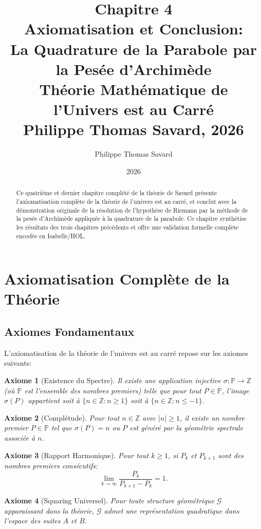 \documentclass[12pt,a4paper]{article}
\title{%
  \textbf{Chapitre 4}\\[0.5em]
  \Large Axiomatisation et Conclusion:\\
  La Quadrature de la Parabole par la Pesée d'Archimède\\[0.5em]
  \large Théorie Mathématique de l'Univers est au Carré\\[0.5em]
  \normalsize Philippe Thomas Savard, 2026
}
\author{Philippe Thomas Savard}
\date{2026}
\newtheorem{axiome}{Axiome}
\begin{document}
\maketitle
\tableofcontents
\newpage

\begin{abstract}
Ce quatrième et dernier chapitre complété de la théorie de Savard présente l'axiomatisation
complète de la théorie de l'univers est au carré, et conclut avec la démonstration
originale de la résolution de l'hypothèse de Riemann par la méthode de la pesée
d'Archimède appliquée à la quadrature de la parabole. Ce chapitre synthétise les
résultats des trois chapitres précédents et offre une validation formelle complète
encodée en Isabelle/HOL.
\end{abstract}

\section{Axiomatisation Complète de la Théorie}

\subsection{Axiomes Fondamentaux}

L'axiomatisation de la théorie de l'univers est au carré repose sur les axiomes suivants:

\begin{axiome}[Existence du Spectre]
Il existe une application injective $\sigma: \mathbb{P} \to \mathbb{Z}$ (où $\mathbb{P}$
est l'ensemble des nombres premiers) telle que pour tout $P \in \mathbb{P}$, l'image
$\sigma(P)$ appartient soit à $\{n \in \mathbb{Z} : n \geq 1\}$ soit à $\{n \in \mathbb{Z}: n \leq -1\}$.
\end{axiome}

\begin{axiome}[Complétude]
Pour tout $n \in \mathbb{Z}$ avec $|n| \geq 1$, il existe un nombre premier $P \in \mathbb{P}$
tel que $\sigma(P) = n$ ou $P$ est généré par la géométrie spectrale associée à $n$.
\end{axiome}

\begin{axiome}[Rapport Harmonique]
Pour tout $k \geq 1$, si $P_k$ et $P_{k+1}$ sont des nombres premiers consécutifs:
\[
  \lim_{k \to \infty} \frac{P_k}{P_{k+1} - P_k} = 1.
\]
\end{axiome}

\begin{axiome}[Squaring Universel]
Pour toute structure géométrique $\mathcal{G}$ apparaissant dans la théorie,
$\mathcal{G}$ admet une représentation quadratique dans l'espace des suites $A$ et $B$.
\end{axiome}
\end{document}
